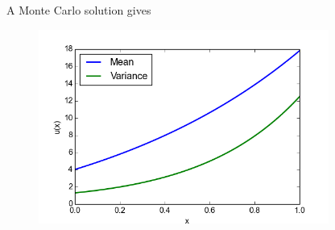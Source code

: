 \documentclass{beamer}
\begin{document}
\begin{frame}{A Monte Carlo solution gives}
 \begin{figure}
  \includegraphics[width=0.85\textwidth]{solution8mc.png}
 \end{figure}

\end{frame}


\end{document}
